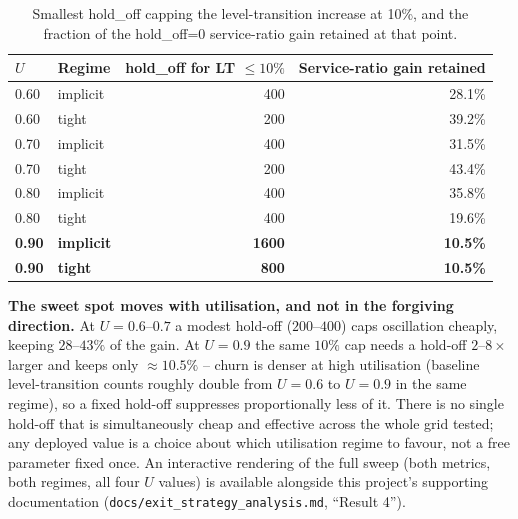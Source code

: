 \begin{table}[h]
\centering
\caption{Smallest hold\_off capping the level-transition increase at 10\%, and the fraction of the hold\_off=0 service-ratio gain retained at that point.}
\label{tab:tempered-sweet-spot}
\begin{tabular}{llrr}
\toprule
$U$ & Regime & hold\_off for LT $\leq 10\%$ & Service-ratio gain retained \\
\midrule
0.60 & implicit & 400 & 28.1\% \\
0.60 & tight & 200 & 39.2\% \\
0.70 & implicit & 400 & 31.5\% \\
0.70 & tight & 200 & 43.4\% \\
0.80 & implicit & 400 & 35.8\% \\
0.80 & tight & 400 & 19.6\% \\
\textbf{0.90} & \textbf{implicit} & \textbf{1600} & \textbf{10.5\%} \\
\textbf{0.90} & \textbf{tight} & \textbf{800} & \textbf{10.5\%} \\
\bottomrule
\end{tabular}
\end{table}

\textbf{The sweet spot moves with utilisation, and not in the forgiving
direction.} At $U=0.6$--$0.7$ a modest hold-off ($200$--$400$) caps
oscillation cheaply, keeping $28$--$43\%$ of the gain. At $U=0.9$ the same
$10\%$ cap needs a hold-off $2$--$8\times$ larger and keeps only
$\approx 10.5\%$ -- churn is denser at high utilisation (baseline
level-transition counts roughly double from $U=0.6$ to $U=0.9$ in the same
regime), so a fixed hold-off suppresses proportionally less of it. There is
no single hold-off that is simultaneously cheap and effective across the
whole grid tested; any deployed value is a choice about which utilisation
regime to favour, not a free parameter fixed once. An interactive rendering
of the full sweep (both metrics, both regimes, all four $U$ values) is
available alongside this project's supporting documentation
(\texttt{docs/exit\_strategy\_analysis.md}, ``Result 4'').

